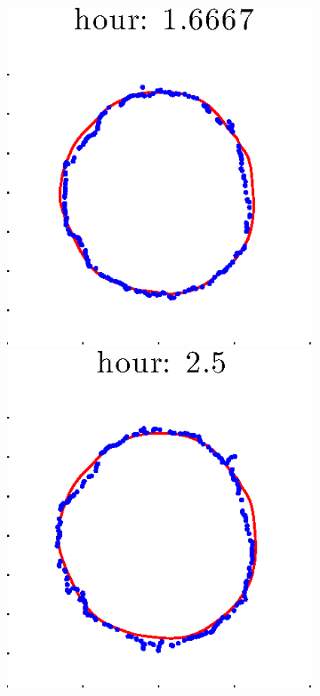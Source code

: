 \documentclass[12pt]{article}
\begin{document}
\begin{figure}[h!]
\begin{subfigure}[b]{.3\textwidth}
		\includegraphics[height=.15\textheight]{Pos0/secondhalf/second3.eps}
		\includegraphics[height=.15\textheight]{Pos0/secondhalf/second4.eps}

\end{subfigure}
\end{figure}
\end{document}

